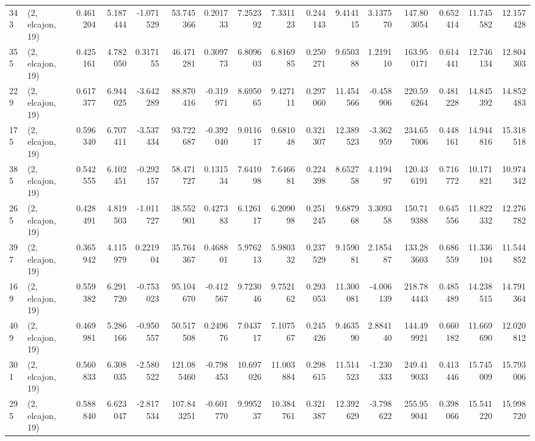 \begin{tabular}{llrrrrrrrrrrrrrr}
343 &  (2, elcajon, 19) &   0.461204 &   5.187444 &  -1.071529 &    53.745366 &   0.201733 &   7.252392 &   7.331123 &  0.244143 &   9.414115 &   3.137570 &   147.803054 &   0.652414 &  11.745582 &  12.157428 \\
355 &  (2, elcajon, 19) &   0.425161 &   4.782050 &   0.317155 &    46.471281 &   0.309773 &   6.809603 &   6.816985 &  0.250271 &   9.650388 &   1.219110 &   163.950171 &   0.614441 &  12.746134 &  12.804303 \\
229 &  (2, elcajon, 19) &   0.617377 &   6.944025 &  -3.642289 &    88.870416 &  -0.319971 &   8.695065 &   9.427111 &  0.297060 &  11.454566 &  -0.458906 &   220.596264 &   0.481228 &  14.845392 &  14.852483 \\
175 &  (2, elcajon, 19) &   0.596340 &   6.707411 &  -3.537434 &    93.722687 &  -0.392040 &   9.011617 &   9.681048 &  0.321307 &  12.389523 &  -3.362959 &   234.657006 &   0.448161 &  14.944816 &  15.318518 \\
385 &  (2, elcajon, 19) &   0.542555 &   6.102451 &  -0.292157 &    58.471727 &   0.131534 &   7.641098 &   7.646681 &  0.224398 &   8.652758 &   4.119497 &   120.436191 &   0.716772 &  10.171821 &  10.974342 \\
265 &  (2, elcajon, 19) &   0.428491 &   4.819503 &  -1.011727 &    38.552901 &   0.427383 &   6.126117 &   6.209098 &  0.251245 &   9.687968 &   3.309358 &   150.719388 &   0.645556 &  11.822332 &  12.276782 \\
397 &  (2, elcajon, 19) &   0.365942 &   4.115979 &   0.221904 &    35.764367 &   0.468801 &   5.976213 &   5.980332 &  0.237529 &   9.159081 &   2.185487 &   133.283603 &   0.686559 &  11.336104 &  11.544852 \\
169 &  (2, elcajon, 19) &   0.559382 &   6.291720 &  -0.753023 &    95.104670 &  -0.412567 &   9.723046 &   9.752162 &  0.293053 &  11.300081 &  -4.006139 &   218.784443 &   0.485489 &  14.238515 &  14.791364 \\
409 &  (2, elcajon, 19) &   0.469981 &   5.286166 &  -0.950557 &    50.517508 &   0.249676 &   7.043717 &   7.107567 &  0.245426 &   9.463590 &   2.884140 &   144.499921 &   0.660182 &  11.669690 &  12.020812 \\
301 &  (2, elcajon, 19) &   0.560833 &   6.308035 &  -2.580522 &   121.085460 &  -0.798453 &  10.697026 &  11.003884 &  0.298615 &  11.514523 &  -1.230333 &   249.419033 &   0.413446 &  15.745009 &  15.793006 \\
295 &  (2, elcajon, 19) &   0.588840 &   6.623047 &  -2.817534 &   107.843251 &  -0.601770 &   9.995237 &  10.384761 &  0.321387 &  12.392629 &  -3.798622 &   255.959041 &   0.398066 &  15.541220 &  15.998720 \\

\end{tabular}

